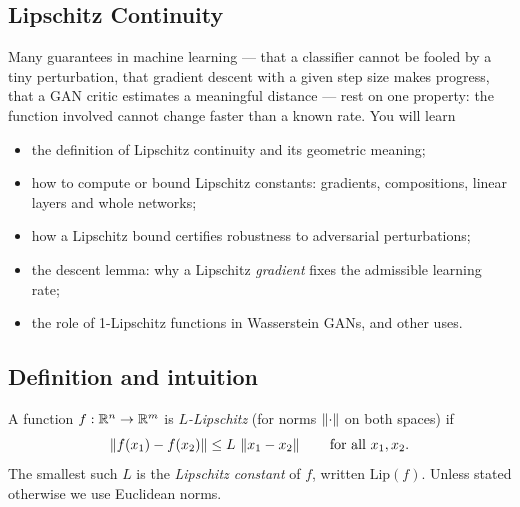 \begin{notechapter}
\chapter{Lipschitz Continuity}\label{ch:lipschitz-continuity}

\begin{chapterintro}
Many guarantees in machine learning --- that a classifier cannot be fooled by
a tiny perturbation, that gradient descent with a given step size makes
progress, that a GAN critic estimates a meaningful distance --- rest on one
property: the function involved cannot change faster than a known rate. You
will learn
\begin{itemize}[nosep]
  \item the definition of Lipschitz continuity and its geometric meaning;
  \item how to compute or bound Lipschitz constants: gradients, compositions,
        linear layers and whole networks;
  \item how a Lipschitz bound certifies robustness to adversarial
        perturbations;
  \item the descent lemma: why a Lipschitz \emph{gradient} fixes the
        admissible learning rate;
  \item the role of 1-Lipschitz functions in Wasserstein GANs, and other uses.
\end{itemize}
\end{chapterintro}

\section{Definition and intuition}\label{lipschitz-continuity:sec:definition}

\begin{definition}\label{lipschitz-continuity:def:lipschitz}
A function $f:\mathbb{R}^n\to\mathbb{R}^m$ is \emph{$L$-Lipschitz} (for norms $\left\|\cdot\right\|$ on
both spaces) if
\begin{equation}\label{lipschitz-continuity:eq:lipschitz}
  \left\|f(x_1) - f(x_2)\right\| \leq L\,\left\|x_1 - x_2\right\|\qquad\text{for all } x_1,x_2.
\end{equation}
The smallest such $L$ is the \emph{Lipschitz constant} of $f$, written
$\mathrm{Lip}(f)$. Unless stated otherwise we use Euclidean norms.
\end{definition}


\end{notechapter}
